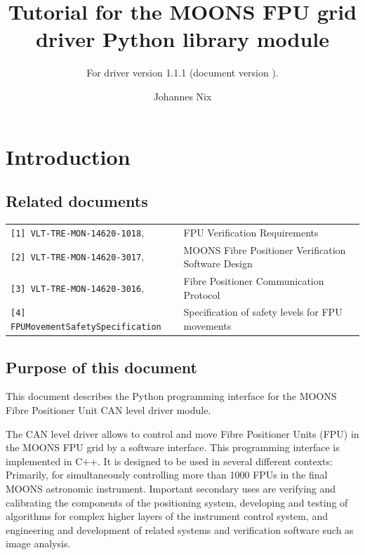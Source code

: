\documentclass[11pt,a4paper]{scrartcl}
\begin{document}
\title{Tutorial for the MOONS FPU grid driver Python library
  module} \subtitle{For driver version 1.1.1 (document version \texttt{}).}

\author{Johannes Nix}

\maketitle

\tableofcontents


\section{Introduction}
\subsection{Related documents}

\begin{tabular}{|ll|}
  \hline
\verb+[1] VLT-TRE-MON-14620-1018+, &  FPU Verification Requirements \\
\verb+[2] VLT-TRE-MON-14620-3017+, & MOONS Fibre Positioner Verification Software Design \\
\verb+[3] VLT-TRE-MON-14620-3016+, & Fibre Positioner Communication Protocol\\
\verb+[4] FPUMovementSafetySpecification+ & Specification of safety levels for FPU movements\\
\hline
\end{tabular}


\subsection{Purpose of this document}
This document describes the Python programming interface for the MOONS
Fibre Positioner Unit CAN level driver module.

The CAN level driver allows to control and move Fibre Positioner Units
(FPU) in the MOONS FPU grid by a software interface. This programming
interface is implemented in C++. It is designed to be used in several
different contexts: Primarily, for simultaneously controlling more
than 1000 FPUs in the final MOONS astronomic instrument. Important
secondary uses are verifying and calibrating the components of the
positioning system, developing and testing of algorithms for complex
higher layers of the instrument control system, and engineering and
development of related systems and verification software such as image
analysis.
\end{document}
